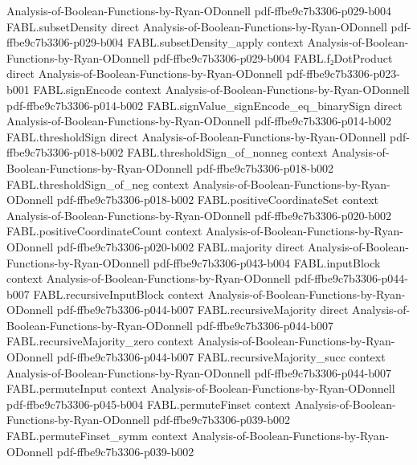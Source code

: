 \begin{theorem}
  {Analysis-of-Boolean-Functions-by-Ryan-ODonnell}
  {pdf-ffbe9c7b3306-p029-b004}
\proofstep
  {FABL.subsetDensity}
  {direct}
  {Analysis-of-Boolean-Functions-by-Ryan-ODonnell}
  {pdf-ffbe9c7b3306-p029-b004}
\proofstep
  {FABL.subsetDensity_apply}
  {context}
  {Analysis-of-Boolean-Functions-by-Ryan-ODonnell}
  {pdf-ffbe9c7b3306-p029-b004}
\proofstep
  {FABL.f₂DotProduct}
  {direct}
  {Analysis-of-Boolean-Functions-by-Ryan-ODonnell}
  {pdf-ffbe9c7b3306-p023-b001}
\proofstep
  {FABL.signEncode}
  {context}
  {Analysis-of-Boolean-Functions-by-Ryan-ODonnell}
  {pdf-ffbe9c7b3306-p014-b002}
\proofstep
  {FABL.signValue_signEncode_eq_binarySign}
  {direct}
  {Analysis-of-Boolean-Functions-by-Ryan-ODonnell}
  {pdf-ffbe9c7b3306-p014-b002}
\proofstep
  {FABL.thresholdSign}
  {direct}
  {Analysis-of-Boolean-Functions-by-Ryan-ODonnell}
  {pdf-ffbe9c7b3306-p018-b002}
\proofstep
  {FABL.thresholdSign_of_nonneg}
  {context}
  {Analysis-of-Boolean-Functions-by-Ryan-ODonnell}
  {pdf-ffbe9c7b3306-p018-b002}
\proofstep
  {FABL.thresholdSign_of_neg}
  {context}
  {Analysis-of-Boolean-Functions-by-Ryan-ODonnell}
  {pdf-ffbe9c7b3306-p018-b002}
\proofstep
  {FABL.positiveCoordinateSet}
  {context}
  {Analysis-of-Boolean-Functions-by-Ryan-ODonnell}
  {pdf-ffbe9c7b3306-p020-b002}
\proofstep
  {FABL.positiveCoordinateCount}
  {context}
  {Analysis-of-Boolean-Functions-by-Ryan-ODonnell}
  {pdf-ffbe9c7b3306-p020-b002}
\proofstep
  {FABL.majority}
  {direct}
  {Analysis-of-Boolean-Functions-by-Ryan-ODonnell}
  {pdf-ffbe9c7b3306-p043-b004}
\proofstep
  {FABL.inputBlock}
  {context}
  {Analysis-of-Boolean-Functions-by-Ryan-ODonnell}
  {pdf-ffbe9c7b3306-p044-b007}
\proofstep
  {FABL.recursiveInputBlock}
  {context}
  {Analysis-of-Boolean-Functions-by-Ryan-ODonnell}
  {pdf-ffbe9c7b3306-p044-b007}
\proofstep
  {FABL.recursiveMajority}
  {direct}
  {Analysis-of-Boolean-Functions-by-Ryan-ODonnell}
  {pdf-ffbe9c7b3306-p044-b007}
\proofstep
  {FABL.recursiveMajority_zero}
  {context}
  {Analysis-of-Boolean-Functions-by-Ryan-ODonnell}
  {pdf-ffbe9c7b3306-p044-b007}
\proofstep
  {FABL.recursiveMajority_succ}
  {context}
  {Analysis-of-Boolean-Functions-by-Ryan-ODonnell}
  {pdf-ffbe9c7b3306-p044-b007}
\proofstep
  {FABL.permuteInput}
  {context}
  {Analysis-of-Boolean-Functions-by-Ryan-ODonnell}
  {pdf-ffbe9c7b3306-p045-b004}
\proofstep
  {FABL.permuteFinset}
  {context}
  {Analysis-of-Boolean-Functions-by-Ryan-ODonnell}
  {pdf-ffbe9c7b3306-p039-b002}
\proofstep
  {FABL.permuteFinset_symm}
  {context}
  {Analysis-of-Boolean-Functions-by-Ryan-ODonnell}
  {pdf-ffbe9c7b3306-p039-b002}
\proofstep

\end{theorem}

